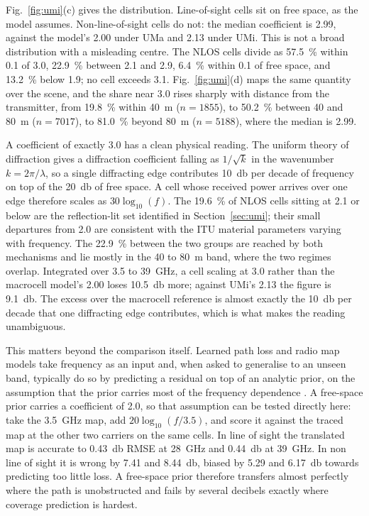 \documentclass[conference]{IEEEtran}
\begin{document}
Fig.~\ref{fig:umi}(c) gives the distribution. Line-of-sight cells sit on free
space, as the model assumes. Non-line-of-sight cells do not: the median coefficient is \num{2.99}, against the model's
\num{2.00} under UMa and \num{2.13} under UMi. This is not a broad
distribution with a misleading centre. The
NLOS cells divide as \SI{57.5}{\percent} within \num{0.1} of \num{3.0},
\SI{22.9}{\percent} between \num{2.1} and \num{2.9}, \SI{6.4}{\percent}
within \num{0.1} of free space, and \SI{13.2}{\percent} below \num{1.9}; no
cell exceeds \num{3.1}. Fig.~\ref{fig:umi}(d) maps the same quantity over the scene, and the share
near \num{3.0} rises sharply with distance from the transmitter, from \SI{19.8}{\percent} within \SI{40}{\metre}
($n = \num{1855}$), to \SI{50.2}{\percent} between \SI{40}{} and
\SI{80}{\metre} ($n = \num{7017}$), to \SI{81.0}{\percent} beyond
\SI{80}{\metre} ($n = \num{5188}$), where the median is \num{2.99}.

A coefficient of exactly \num{3.0} has a clean physical reading. The uniform
theory of diffraction gives a diffraction coefficient falling as
$1/\sqrt{k}$ in the wavenumber $k = 2\pi/\lambda$, so a single diffracting
edge contributes
\SI{10}{\decibel} per decade of frequency on top of the \SI{20}{\decibel} of
free space. A cell whose received power arrives over one edge therefore scales
as $30\log_{10}(f)$. The \SI{19.6}{\percent} of NLOS cells sitting at
\num{2.1} or below are the reflection-lit set identified in
Section~\ref{sec:umi}; their small departures from \num{2.0} are consistent
with the ITU material parameters \cite{iturp2040} varying with frequency. The
\SI{22.9}{\percent} between the two groups are reached by both mechanisms and
lie mostly in the \SI{40}{} to \SI{80}{\metre} band, where the two regimes
overlap. Integrated over \SI{3.5}{} to \SI{39}{\giga\hertz}, a cell scaling at
\num{3.0} rather than the macrocell model's \num{2.00} loses
\SI{10.5}{\decibel} more; against UMi's \num{2.13} the figure is
\SI{9.1}{\decibel}. The excess over the macrocell reference is almost exactly
the \SI{10}{\decibel} per decade that one diffracting edge contributes, which
is what makes the reading unambiguous.

This matters beyond the comparison itself. Learned path loss and radio map
models take frequency as an input \cite{nguyen2021multifreq} and, when asked
to generalise to an unseen band, typically do so by predicting a residual on
top of an analytic prior, on the assumption that the prior carries most of the
frequency dependence \cite{hussain2026zeroshot}. A free-space prior carries a
coefficient of \num{2.0}, so that assumption can be tested directly here: take
the \SI{3.5}{\giga\hertz} map, add $20\log_{10}(f/3.5)$, and score it against
the traced map at the other two carriers on the same cells. In line of sight
the translated map is accurate to \SI{0.43}{\decibel} RMSE at
\SI{28}{\giga\hertz} and \SI{0.44}{\decibel} at \SI{39}{\giga\hertz}. In non
line of sight it is wrong by \SI{7.41}{} and \SI{8.44}{\decibel}, biased by
\SI{5.29}{} and \SI{6.17}{\decibel} towards predicting too little loss. A
free-space prior therefore transfers almost perfectly where the path is
unobstructed and fails by several decibels exactly where coverage prediction
is hardest.
\end{document}
